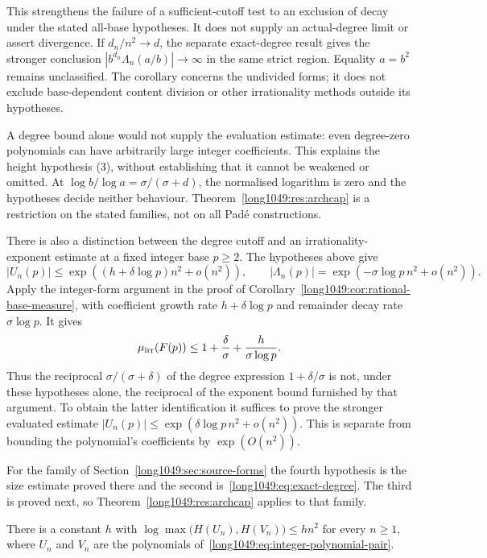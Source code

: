 \documentclass[11pt]{article}
\begin{document}
This strengthens the failure of a sufficient-cutoff test to an exclusion
of decay under the stated all-base hypotheses.  It does not supply an
actual-degree limit or assert divergence.  If $d_n/n^2\to d$, the separate
exact-degree result gives the stronger conclusion
$|b^{d_n}\Lambda_n(a/b)|\to\infty$ in the same strict region.
Equality $a=b^2$ remains unclassified.  The corollary concerns the undivided
forms; it does not exclude base-dependent content division or other
irrationality methods outside its hypotheses.


\noindent A degree bound alone would not supply the evaluation
estimate: even degree-zero polynomials can have arbitrarily large
integer coefficients. This explains the height hypothesis (3),
without establishing that it cannot be weakened or omitted.
At $\log b/\log a=\sigma/(\sigma+d)$, the normalised logarithm
is zero and the hypotheses decide neither behaviour.
Theorem~\ref{long1049:res:archcap} is a restriction on the stated
families, not on all Pad\'e constructions.

There is also a distinction between the degree cutoff and an
irrationality-exponent estimate at a fixed integer base $p\ge2$.
The hypotheses above give
\[
 |U_n(p)|\le\exp((h+\delta\log p)n^2+o(n^2)),\qquad
 |\Lambda_n(p)|=\exp(-\sigma\log p\,n^2+o(n^2)).
\]
Apply the integer-form argument in the proof of
Corollary~\ref{long1049:cor:rational-base-measure}, with coefficient
growth rate $h+\delta\log p$ and remainder decay rate $\sigma\log p$.
It gives
\[
 \mu_{\rm irr}(F(p))\le
 1+\frac{\delta}{\sigma}+\frac{h}{\sigma\log p}.
\]
Thus the reciprocal $\sigma/(\sigma+\delta)$ of the degree expression
$1+\delta/\sigma$ is not, under these hypotheses alone, the reciprocal
of the exponent bound furnished by that argument. To obtain the latter
identification it suffices to prove the stronger evaluated estimate
$|U_n(p)|\le\exp(\delta\log p\,n^2+o(n^2))$. This is separate from
bounding the polynomial's coefficients by $\exp(O(n^2))$.

For the family of Section~\ref{long1049:sec:source-forms} the fourth hypothesis is the
size estimate proved there and the second is~\eqref{long1049:eq:exact-degree}.  The third
is proved next, so Theorem~\ref{long1049:res:archcap} applies to that family.

\begin{lemma}\label{long1049:res:sourceheight}
There is a constant $h$ with
$\log\max\bigl(H(U_n),H(V_n)\bigr)\le hn^{2}$ for every $n\ge1$, where $U_n$ and
$V_n$ are the polynomials of~\eqref{long1049:eq:integer-polynomial-pair}.
\end{lemma}
\end{document}
